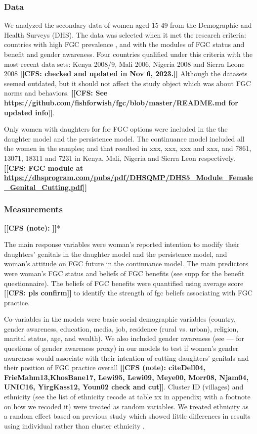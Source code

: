 \documentclass[12pt,]{article}
\newcommand{\comment}[1]{\textbf{[[#1]]}}
\newcommand{\cfcmt}[1]{\comment{CFS: #1}}
\newcommand{\cfonly}[1]{\comment{CFS (note): #1}}
\begin{document}
\subsubsection{Data}\label{data}

We analyzed the secondary data of women aged 15-49 from the Demographic and Health Surveys (DHS).  The data was selected when it met the research criteria:  countries with high FGC prevalence \cite{UNIC16}, and with the modules of FGC status and benefit and gender awareness. Four countries qualified under this criteria with the most recent data sets: Kenya 2008/9, Mali 2006, Nigeria 2008 and Sierra Leone 2008 \cfcmt{checked and updated in Nov 6, 2023.}   Although the datasets seemed outdated, but it should not affect the study object which was about FGC norms and behaviors.  \cfcmt{See https://github.com/fishforwish/fgc/blob/master/README.md for updated info}.

Only women with daughters for for FGC options were included in the the daughter model and the persistence model.   The continuance model included all the women in the samples; and that resulted in xxx, xxx, xxx and xxx, and 7861, 13071, 18311 and 7231 in Kenya, Mali, Nigeria and Sierra Leon respectively.  \cfcmt{FGC module at \url{https://dhsprogram.com/pubs/pdf/DHSQMP/DHS5_Module_Female_Genital_Cutting.pdf}}

\subsubsection{Measurements}\label{measurements}

\cfonly{\cite{Rima08}}*

The main response variables were woman's reported intention to modify their daughters’ genitals in the daughter model and the persistence model, and woman's attitude on FGC future in the continuance model.  The main predictors were woman's FGC status and beliefs of FGC benefits (see supp for the benefit questionnaire).  The beliefs of FGC benefits were quantified using average score \cfcmt{pls confirm} to identify the strength of fgc beliefs associating with FGC practice. 

Co-variables in the models were basic social demographic variables (country, gender awareness, education, media, job, residence (rural vs. urban), religion, marital status, age, and wealth).  We also included gender awareness (see — for questions of gender awareness proxy) in our models to test if women’s gender awareness would associate with their intention of cutting daughters’ genitals and their position of FGC practice overall \cfonly{cite{Dell04, FrieMahm13,KhosBane17, Lewi95, Lewi09, Meye00, Morr08, Njam04, UNIC16, YirgKass12, Youn02} check and cut}.  Cluster ID (villages) and ethnicity (see the list of ethnicity recode at table xx in appendix; with a footnote on how we recoded it) were treated as random variables.  We treated ethnicity as a random effect based on previous study which showed little differences in results using individual rather than cluster ethnicity \cite{Hayf05}.
\end{document}
